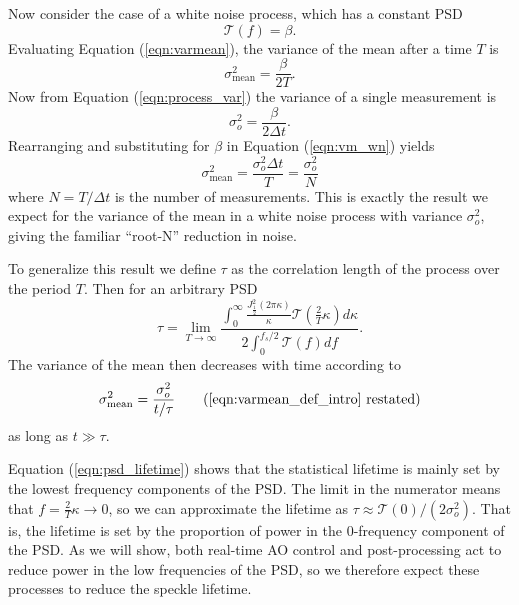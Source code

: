 \documentclass[10pt,preprint]{aastex631}
\begin{document}
Now consider the case of a white noise process, which has a constant PSD
\begin{equation}
\mathcal{T}(f) = \beta.
\end{equation}
Evaluating Equation (\ref{eqn:varmean}), the variance of the mean after a time $T$ is 
\begin{equation}
\sigma_\mathrm{mean}^2 = \frac{\beta}{2T}.
\label{eqn:vm_wn}
\end{equation}
Now from Equation (\ref{eqn:process_var}) the variance of a single measurement is
\begin{equation}
\sigma_o^2  = \frac{\beta}{2\Delta t}.
\end{equation}
Rearranging and substituting for $\beta$ in Equation (\ref{eqn:vm_wn}) yields
\begin{equation}
\sigma_\mathrm{mean}^2 =  \frac{\sigma_o^2 \Delta t}{T} = \frac{\sigma_o^2}{N}
\end{equation}
where $N = T/\Delta t$ is the number of measurements.  This is exactly the result we expect for the variance of the mean in a white noise process with variance $\sigma^2_o$, giving the familiar ``root-N'' reduction in noise.

To generalize this result we define $\tau$ as the correlation length of the process over the period $T$.  Then for an arbitrary PSD
\begin{equation}
\tau = \lim_{T\to\infty}\frac{ \displaystyle\int_0^{\infty} \frac{ J_{\frac{1}{2}}^2(2\pi \kappa)}{\kappa} \mathcal{T}\left( \frac{2}{T} \kappa \right) d\kappa}{ 2 \displaystyle\int_{0}^{f_s/2} \mathcal{T}(f) df}.
\label{eqn:psd_lifetime}
\end{equation}
The variance of the mean then decreases with time according to
\begin{equation}
\sigma_\mathrm{mean}^2 =  \frac{\sigma_o^2}{t/\tau} \tag{\ref{eqn:varmean_def_intro} restated}
\end{equation}
as long as $t \gg \tau$.

Equation (\ref{eqn:psd_lifetime}) shows that the statistical lifetime is mainly set by the lowest frequency components of the PSD.  The limit in the numerator means that $f = \frac{2}{T}\kappa \rightarrow 0$, so we can approximate the lifetime as $\tau \approx \mathcal{T}(0)/(2\sigma_o^2)$.  That is, the lifetime is set by the proportion of power in the 0-frequency component of the PSD.  As we will show, both real-time AO control and post-processing act to reduce power in the low frequencies of the PSD, so we therefore expect these processes to reduce the speckle lifetime.
\end{document}
